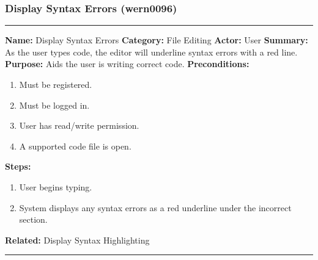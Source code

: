 \documentclass[11pt]{report}
\begin{document}
\subsubsection{Display Syntax Errors (wern0096)}
\vspace{2pt}
\hrule
\vspace{8pt}
	\noindent\textbf{Name:} Display Syntax Errors \newline
	\textbf{Category:} File Editing \newline
	\textbf{Actor:} User \newline
	\textbf{Summary:} As the user types code, the editor will underline syntax errors with a red line. \newline
	\textbf{Purpose:} Aids the user is writing correct code. \newline
	\textbf{Preconditions:}
	\begin{enumerate}
		\item Must be registered.
		\item Must be logged in.
		\item User has read/write permission.
		\item A supported code file is open.
	\end{enumerate}
	\textbf{Steps:}
	\begin{enumerate}
		\item User begins typing.
		\item System displays any syntax errors as a red underline under the incorrect section.
	\end{enumerate}
	\textbf{Related:} Display Syntax Highlighting
\vspace{8pt}
\hrule
\newpage
\end{document}
